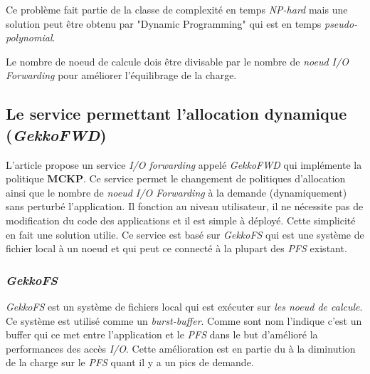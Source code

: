 \documentclass[10pt, a4paper]{article}
\begin{document}
Ce problème fait partie de la classe de complexité en temps \emph{NP-hard} mais une solution peut être obtenu par "Dynamic Programming" qui est en temps \emph{pseudo-polynomial}.

Le nombre de noeud de calcule dois être divisable par le nombre de \emph{noeud I/O Forwarding} pour améliorer l'équilibrage de la charge.


\subsection{Le service permettant l'allocation dynamique (\emph{GekkoFWD})}

L'article propose un service \emph{I/O forwarding} appelé \emph{GekkoFWD} qui
implémente la politique \textbf{MCKP}. Ce service permet le changement de politiques d'allocation ainsi que le nombre de \emph{noeud I/O Forwarding} à la demande (dynamiquement) sans perturbé l'application. Il fonction au niveau utilisateur, il ne nécessite pas de modification du code des applications et il est simple à déployé. Cette simplicité en fait une solution utilie.
Ce service est basé sur \emph{GekkoFS} qui est une système de fichier local à un noeud et qui peut ce connecté à la plupart des \emph{PFS} existant.

\subsubsection{\emph{GekkoFS}}

\emph{GekkoFS} est un système de fichiers local qui est exécuter sur \emph{les noeud de calcule}. Ce système est utilisé comme un \emph{burst-buffer}. Comme sont nom l'indique c'est un buffer qui ce met entre l'application et le \emph{PFS} dans le but d'amélioré la performances des accès \emph{I/O}. Cette amélioration est en partie du à la diminution de la charge sur le \emph{PFS} quant il y a un pics de demande.
\end{document}
